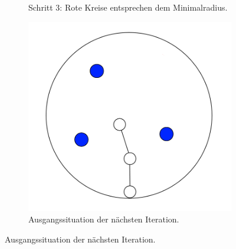 \begin{figure} [hbtp]
\begin{subfigure}[t]{.3\textwidth}
		\caption{Schritt 3: Rote Kreise entsprechen dem Minimalradius.}
		\label{subfig:SCA_Basic5}
	\end{subfigure}
	\hspace{.03\textwidth}
	\begin{subfigure}[t]{.3\textwidth}
		\centering
		\includegraphics[width=\linewidth]{images/SCA_Basic6.png}
		\caption{Ausgangssituation der nächsten Iteration.}
		\label{subfig:SCA_Basic6}
	\end{subfigure}


\end{figure}
